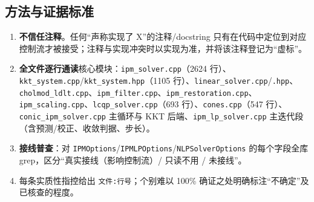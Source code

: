 \documentclass[11pt,a4paper]{ctexart}
\newcommand{\file}[1]{\texttt{#1}}
\newcommand{\opt}[1]{\texttt{#1}}
\begin{document}
\subsection{方法与证据标准}
\begin{enumerate}[leftmargin=2em]
  \item \textbf{不信任注释}。任何``声称实现了 X''的注释/docstring 只有在代码中定位到对应控制流才被接受；注释与实现冲突时以实现为准，并将该注释登记为``虚标''。
  \item \textbf{全文件逐行通读}核心模块：\file{ipm\_solver.cpp}（2624 行）、\file{kkt\_system.cpp}/\file{kkt\_system.hpp}（1105 行）、\file{linear\_solver.cpp}/\file{.hpp}、\file{cholmod\_ldlt.cpp}、\file{ipm\_filter.cpp}、\file{ipm\_restoration.cpp}、\file{ipm\_scaling.cpp}、\file{lcqp\_solver.cpp}（693 行）、\file{cones.cpp}（547 行）、\file{conic\_ipm\_solver.cpp} 主循环与 KKT 后端、\file{ipm\_lp\_solver.cpp} 主迭代段（含预测/校正、收敛判据、步长）。
  \item \textbf{接线普查}：对 \opt{IPMOptions}/\opt{IPMLPOptions}/\opt{NLPSolverOptions} 的每个字段全库 grep，区分``真实接线（影响控制流）/ 只读不用 / 未接线''。
  \item 每条实质性指控给出 \file{文件:行号}；个别难以 100\% 确证之处明确标注``不确定''及已核查的程度。
\end{enumerate}
\end{document}
